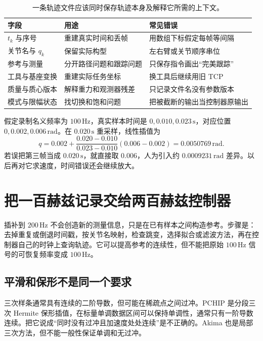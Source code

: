 \begin{table}[htbp]\centering\small
\begin{tabularx}{\linewidth}{p{31mm}XX}\toprule
字段 & 用途 & 常见错误\\\midrule
$t_k$ 与序号 & 重建真实时间和丢帧 & 用数组下标假定每帧等间隔\\
关节名与 $q_k$ & 保留实际构型 & 左右臂或关节顺序串位\\
参考与测量 & 分开路径问题和跟踪问题 & 只保存指令画出“完美跟踪”\\
工具与基座变换 & 重建实际任务坐标 & 换工具后继续用旧 TCP\\
质量与质心版本 & 解释重力和观测器残差 & 只记录文件名没有参数版本\\
模式与限幅状态 & 找切换和饱和问题 & 把被截断的输出当控制器原输出\\\bottomrule
\end{tabularx}
\caption{一条轨迹文件应该同时保存轨迹本身及解释它所需的上下文。}
\end{table}

假定录制名义频率为 $100\,\mathrm{Hz}$，真实样本时间是 $0,0.010,0.023\,\mathrm{s}$，对应位置 $0,0.002,0.006\,\mathrm{rad}$。在 $0.020\,\mathrm{s}$ 重采样，线性插值为
\[
q=0.002+\frac{0.020-0.010}{0.023-0.010}(0.006-0.002)
=0.0050769\,\mathrm{rad}.
\]
若误把第三帧当成 $0.020\,\mathrm{s}$，就直接取 $0.006$，人为引入约 $0.0009231\,\mathrm{rad}$ 差异。以后再对它求速度，时间错误还会继续放大。

\section{把一百赫兹记录交给两百赫兹控制器}

插补到 $200\,\mathrm{Hz}$ 不会创造新的测量信息，只是在已有样本之间构造参考。步骤是：去掉重复或倒退时间戳，按关节名映射，检查跳变，选择拟合或滤波方法，再在控制器自己的时钟上查询轨迹。它可以提高参考的连续性，但不能把原始 $100\,\mathrm{Hz}$ 信号的可恢复频率变成 $100\,\mathrm{Hz}$。

\subsection{平滑和保形不是同一个要求}

三次样条通常具有连续的二阶导数，但可能在稀疏点之间过冲。PCHIP 是分段三次 Hermite 保形插值，在标量单调数据区间可以保持单调性，通常只有一阶导数连续。把它说成“同时没有过冲且加速度处处连续”是不正确的。Akima 也是局部三次方法，但不能一般性保证单调和无过冲。


